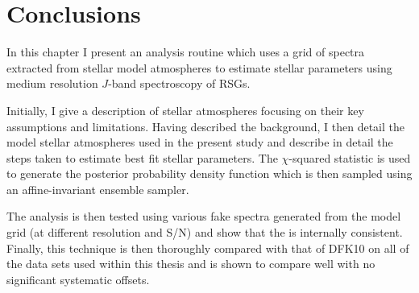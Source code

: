 
\section{Conclusions} %
\label{sub:conclusions}

In this chapter I present an analysis routine which uses a grid of spectra extracted from stellar model atmospheres to estimate stellar parameters using medium resolution $J$-band spectroscopy of RSGs.

Initially, I give a description of stellar atmospheres focusing on their key assumptions and limitations.
Having described the background, I then detail the model stellar atmospheres used in the present study and describe in detail the steps taken to estimate best fit stellar parameters.
The $\chi$-squared statistic is used to generate the posterior probability density function which is then sampled using an affine-invariant ensemble sampler.

The analysis is then tested using various fake spectra generated from the model grid (at different resolution and S/N) and show that the is internally consistent.
Finally, this technique is then thoroughly compared with that of DFK10 on all of the data sets used within this thesis and is shown to compare well with no significant systematic offsets.

